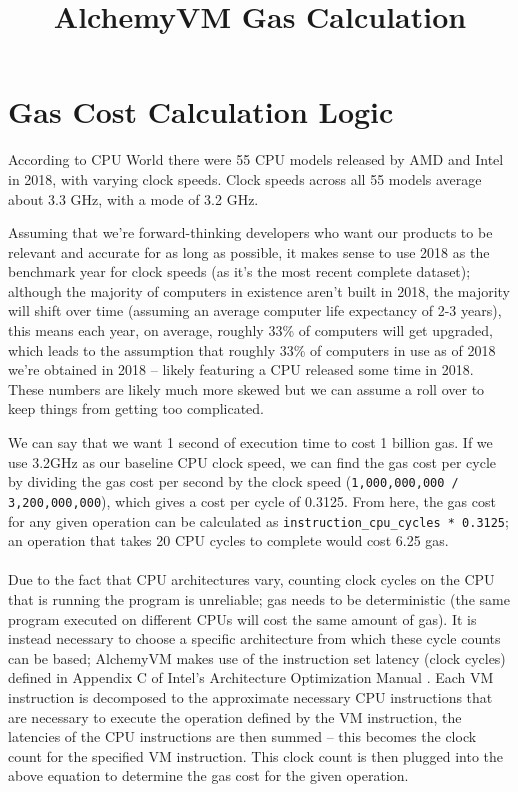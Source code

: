 \documentclass{article}
\title{AlchemyVM Gas Calculation}
\begin{document}
\maketitle

\section{Gas Cost Calculation
Logic}

According to CPU World \cite{CPU World} there were 55 CPU models released by AMD and Intel in 2018, with varying clock speeds. Clock speeds across all 55 models average about 3.3 GHz, with a mode of 3.2 GHz.

Assuming that we're forward-thinking developers who want our products to be relevant and accurate for as long as possible, it makes sense to use 2018 as the benchmark year for clock speeds (as it's the most recent complete dataset); although the majority of computers in existence aren't built in 2018, the majority will shift over time (assuming an average computer life expectancy of 2-3 years), this means each year, on average, roughly 33\% of computers will get upgraded, which leads to the assumption that roughly 33\% of computers in use as of 2018 we're obtained in 2018 -- likely featuring a CPU released some time in 2018. These numbers are likely much more skewed but we can assume a roll over to keep things from getting too complicated.

We can say that we want 1 second of execution time to cost 1 billion gas. If we use 3.2GHz as our baseline CPU clock speed, we can find the gas cost per cycle by dividing the gas cost per second by the clock speed (\texttt{1,000,000,000 / 3,200,000,000}), which gives a cost per cycle of 0.3125. From here, the gas cost for any given operation can be calculated as \texttt{instruction\_cpu\_cycles\ *\ 0.3125}; an operation that takes 20 CPU cycles to complete would cost 6.25 gas.
\\\\

Due to the fact that CPU architectures vary, counting clock cycles on the CPU that is running the program is unreliable; gas needs to be deterministic (the same program executed on different CPUs will cost the same amount of gas). It is instead necessary to choose a specific architecture from which these cycle counts can be based; AlchemyVM makes use of the instruction set latency (clock cycles) defined in Appendix C of Intel's Architecture Optimization Manual \cite{Intel Manual}. Each VM instruction is decomposed to the approximate necessary CPU instructions that are necessary to execute the operation defined by the VM instruction, the latencies of the CPU instructions are then summed -- this becomes the clock count for the specified VM instruction. This clock count is then plugged into the above equation to determine the gas cost for the given operation.
\end{document}
